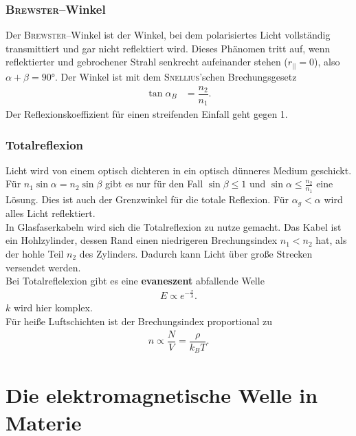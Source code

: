 \documentclass[a4paper,12pt]{article}
\numberwithin{equation}{section}
\begin{document}
\subsubsection{\textsc{Brewster}--Winkel}
Der \textsc{Brewster}--Winkel ist der Winkel, bei dem polarisiertes Licht vollständig transmittiert und gar nicht reflektiert wird. Dieses Phänomen tritt auf, wenn reflektierter und gebrochener Strahl senkrecht aufeinander stehen ($r_{| |}=0$), also $\alpha +\beta =\ang{90}$. Der Winkel ist mit dem \textsc{Snellius}'schen Brechungsgesetz
\begin{align} 
        \tan \alpha _B&=\dfrac{n_2}{n_1}
.\end{align} 
Der Reflexionskoeffizient für einen streifenden Einfall geht gegen 1.

\subsubsection{Totalreflexion}
Licht wird von einem optisch dichteren in ein optisch dünneres Medium geschickt. Für $n_1\sin \alpha =n_2\sin \beta $ gibt es nur für den Fall $\sin \beta \leq 1$ und $\sin \alpha \leq \tfrac{n_2}{n_1}$ eine Lösung. Dies ist auch der Grenzwinkel für die totale Reflexion. Für $\alpha _g<\alpha $ wird alles Licht reflektiert.\\\indent
In Glasfaserkabeln wird sich die Totalreflexion zu nutze gemacht. Das Kabel ist ein Hohlzylinder, dessen Rand einen niedrigeren Brechungsindex $n_1<n_2$ hat, als der hohle Teil $n_2$ des Zylinders. Dadurch kann Licht über große Strecken versendet werden.\\\indent
Bei Totalreflelexion gibt es eine \textbf{evaneszent} abfallende Welle
\begin{align} 
        E\propto e^{-\tfrac{x}{\lambda }}
.\end{align} 
$k$ wird hier komplex.\\\indent
Für heiße Luftschichten ist der Brechungsindex proportional zu
\begin{align} 
        n\propto \dfrac{N}{V}=\dfrac{\rho }{k_BT}
.\end{align} 

\newpage
\section{Die elektromagnetische Welle in Materie}
\end{document}
